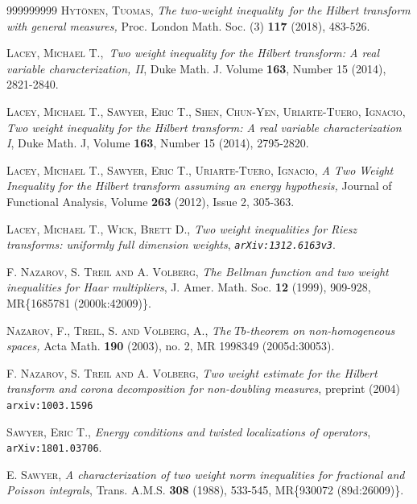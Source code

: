 \documentclass{amsart}%
\theoremstyle{plain}
\numberwithin{equation}{section}
\begin{document}
\begin{thebibliography}{999999999}                                                                                        %
\textsc{Hyt\"{o}nen, Tuomas, }\textit{The two-weight
inequality\ for the Hilbert transform with general measures, }Proc. London
Math. Soc. (3) \textbf{117} (2018), 483-526.

\textsc{Lacey, Michael T.,}\textit{\ Two weight inequality
for the Hilbert transform: A real variable characterization, II}, Duke Math.
J. Volume \textbf{163}, Number 15 (2014), 2821-2840.

\textsc{Lacey, Michael T., Sawyer, Eric T.,
Shen, Chun-Yen, Uriarte-Tuero, Ignacio,} \textit{Two weight inequality for the
Hilbert transform: A real variable characterization I}, Duke Math. J, Volume
\textbf{163}, Number 15 (2014), 2795-2820.

\textsc{Lacey, Michael T., Sawyer, Eric T.,
Uriarte-Tuero, Ignacio,} \textit{A Two Weight Inequality for the Hilbert
transform assuming an energy hypothesis, } Journal of Functional Analysis,
Volume \textbf{263} (2012), Issue 2, 305-363.

\textsc{Lacey, Michael T., Wick, Brett D.,} \textit{Two
weight inequalities for Riesz transforms: uniformly full dimension weights},
\textit{\texttt{arXiv:1312.6163v3}}.

\textsc{F. Nazarov, S. Treil and A. Volberg,} \textit{The
Bellman function and two weight inequalities for Haar multipliers}, J. Amer.
Math. Soc. \textbf{12} (1999), 909-928, MR\{1685781 (2000k:42009)\}.

\textsc{Nazarov, F., Treil, S. and Volberg, A.,}
\textit{The }$Tb$\textit{-theorem on non-homogeneous spaces,} Acta Math.
\textbf{190} (2003), no. 2, MR 1998349 (2005d:30053).

\textsc{F. Nazarov, S. Treil and A. Volberg,} \textit{Two
weight estimate for the Hilbert transform and corona decomposition for
non-doubling measures}, preprint (2004) \texttt{arxiv:1003.1596}

\textsc{Sawyer, Eric T.,} \textit{Energy conditions and
twisted localizations of operators}, \texttt{arXiv:1801.03706}.

\textsc{E. Sawyer,} \textit{A characterization of two
weight norm inequalities for fractional and Poisson integrals}, Trans. A.M.S.
\textbf{308} (1988), 533-545, MR\{930072 (89d:26009)\}.


\end{thebibliography}
\end{document}
